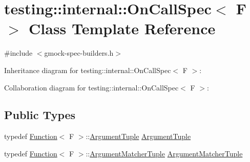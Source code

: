 \hypertarget{classtesting_1_1internal_1_1_on_call_spec}{}\section{testing\+:\+:internal\+:\+:On\+Call\+Spec$<$ F $>$ Class Template Reference}
\label{classtesting_1_1internal_1_1_on_call_spec}


{\ttfamily \#include $<$gmock-\/spec-\/builders.\+h$>$}



Inheritance diagram for testing\+:\+:internal\+:\+:On\+Call\+Spec$<$ F $>$\+:


Collaboration diagram for testing\+:\+:internal\+:\+:On\+Call\+Spec$<$ F $>$\+:
\subsection*{Public Types}
\begin{DoxyCompactItemize}
\item 
typedef \hyperlink{structtesting_1_1internal_1_1_function}{Function}$<$ F $>$\+::\hyperlink{classtesting_1_1internal_1_1_on_call_spec_a70ffab8b915b7b48a90f5ce256da806f}{Argument\+Tuple} \hyperlink{classtesting_1_1internal_1_1_on_call_spec_a70ffab8b915b7b48a90f5ce256da806f}{Argument\+Tuple}
\item 
typedef \hyperlink{structtesting_1_1internal_1_1_function}{Function}$<$ F $>$\+::\hyperlink{classtesting_1_1internal_1_1_on_call_spec_a3240f159f0a9d8cda208bc256da35074}{Argument\+Matcher\+Tuple} \hyperlink{classtesting_1_1internal_1_1_on_call_spec_a3240f159f0a9d8cda208bc256da35074}{Argument\+Matcher\+Tuple}
\end{DoxyCompactItemize}
